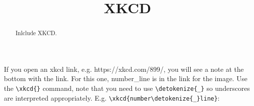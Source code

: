 \documentclass{ximera}
\title[Example:]{XKCD}
\begin{document}
\begin{abstract}
  Inlclude XKCD.
\end{abstract}
\maketitle

If you open an xkcd link, e.g. https://xkcd.com/899/, you will see a note at the bottom with the link. For this one, number\_line is in the link for the image. Use the \verb!\xkcd{}! command, note that you need to use \verb!\detokenize{_}! so underscores are interpreted appropriately. E.g. \verb!\xkcd{number\detokenize{_}line}!:

\end{document}
